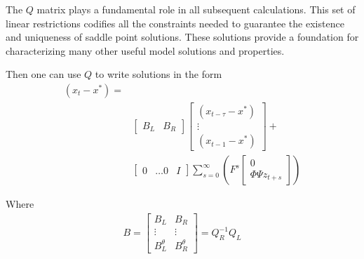 \documentclass{article}
\begin{document}
{The $Q$ matrix plays a fundamental role in all subsequent calculations.
This set of linear restrictions codifies all the constraints needed to
guarantee the existence and uniqueness of saddle point solutions. These
solutions provide a foundation for characterizing many other useful 
model solutions and properties.


Then one can use $Q$ to write solutions in the form
\begin{equation*}
  \begin{split}
(x_{t}-x^\ast) = &\\
&\begin{bmatrix}
B_L& B_R  
\end{bmatrix}
\begin{bmatrix}
    (x_{t-\tau}-x^\ast)\\ \vdots\\(x_{t-1}-x^\ast)
  \end{bmatrix} + \\
&  \begin{bmatrix}
  0&\dots 0&I
  \end{bmatrix}
\sum_{s=0}^\infty ( F^{s} 
\begin{bmatrix}
0\\
\Phi \Psi z_{t+s}  
\end{bmatrix})\label{basic}
  \end{split}
\end{equation*}

Where
\begin{gather*}
B=  \begin{bmatrix}
B_L&B_R\\
\vdots&\vdots\\
B_L^\theta&B_R^\theta
  \end{bmatrix}
= Q_R^{-1} Q_L
\end{gather*}


}
\end{document}
